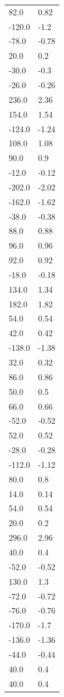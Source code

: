 \begin{longtable}{ll}
82.0 & 0.82 \\
-120.0 & -1.2 \\
-78.0 & -0.78 \\
20.0 & 0.2 \\
-30.0 & -0.3 \\
-26.0 & -0.26 \\
236.0 & 2.36 \\
154.0 & 1.54 \\
-124.0 & -1.24 \\
108.0 & 1.08 \\
90.0 & 0.9 \\
-12.0 & -0.12 \\
-202.0 & -2.02 \\
-162.0 & -1.62 \\
-38.0 & -0.38 \\
88.0 & 0.88 \\
96.0 & 0.96 \\
92.0 & 0.92 \\
-18.0 & -0.18 \\
134.0 & 1.34 \\
182.0 & 1.82 \\
54.0 & 0.54 \\
42.0 & 0.42 \\
-138.0 & -1.38 \\
32.0 & 0.32 \\
86.0 & 0.86 \\
50.0 & 0.5 \\
66.0 & 0.66 \\
-52.0 & -0.52 \\
52.0 & 0.52 \\
-28.0 & -0.28 \\
-112.0 & -1.12 \\
80.0 & 0.8 \\
14.0 & 0.14 \\
54.0 & 0.54 \\
20.0 & 0.2 \\
296.0 & 2.96 \\
40.0 & 0.4 \\
-52.0 & -0.52 \\
130.0 & 1.3 \\
-72.0 & -0.72 \\
-76.0 & -0.76 \\
-170.0 & -1.7 \\
-136.0 & -1.36 \\
-44.0 & -0.44 \\
40.0 & 0.4 \\
40.0 & 0.4 \\

\end{longtable}
